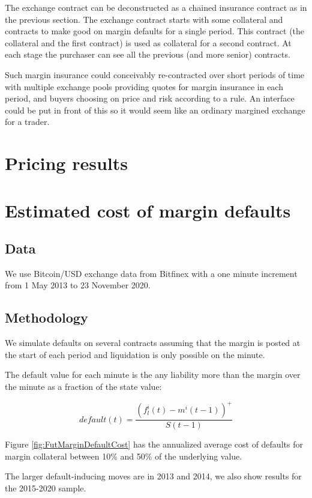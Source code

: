 \documentclass[12pt]{article}
\begin{document}
The exchange contract can be deconstructed as a chained insurance contract as in the previous section. The exchange contract starts with some collateral and contracts to make good on margin defaults for a single period. This contract (the collateral and the first contract) is used as collateral for a second contract. At each stage the purchaser can see all the previous (and more senior) contracts.

Such margin insurance could conceivably re-contracted over short periods of time with multiple exchange pools providing quotes for margin insurance in each period, and buyers choosing on price and risk according to a rule. An interface could be put in front of this so it would seem like an ordinary margined exchange for a trader.

\section{Pricing results}

\section{Estimated cost of margin defaults}

\subsection*{Data}
We use Bitcoin/USD exchange data from Bitfinex with a one minute increment from 1 May 2013 to 23 November 2020. 

\subsection*{Methodology}
We simulate defaults on several contracts assuming that the margin is posted at the start of each period and liquidation is only possible on the minute. 

The default value for each minute is the any liability more than the margin over the minute as a fraction of the state value: 

\begin{equation} \label{default_est}
default(t) = \frac{(f_l^i(t)- m^i(t-1) )^+}{S(t-1)}
\end{equation}

Figure \ref{fig:FutMarginDefaultCost} has the annualized average cost of defaults for margin collateral between 10\% and 50\% of the underlying value. 

The larger default-inducing moves are in 2013 and 2014, we also show results for the 2015-2020 sample. 
\end{document}
